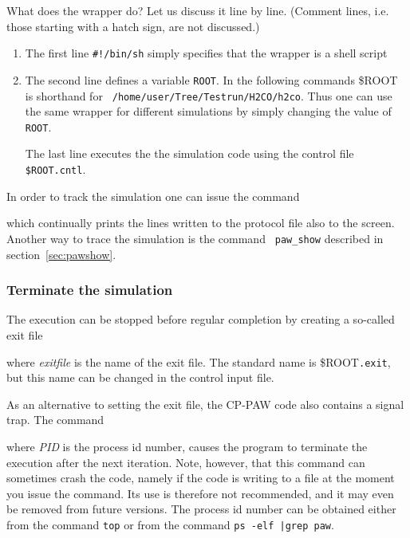\documentclass[final,12pt,makeidx,DIV=calc]{article}
\begin{document}
What does the wrapper do? Let us discuss it line by line. (Comment
lines, i.e. those starting with a hatch sign, are not discussed.)
\begin{enumerate}
\item The first line {\tt \#!/bin/sh} simply specifies that the
  wrapper is a shell script
\item The second line defines a variable {\tt ROOT}. In the following
  commands \${ROOT} is shorthand for {\tt
  /home/user/Tree/Testrun/H2CO/h2co}. Thus one can use the same
  wrapper for different simulations by simply changing the value of
  {\tt ROOT}.
\begin{sloppypar}
  The last line executes the the simulation code using the control
  file {\tt \${ROOT}.cntl}. 
\end{sloppypar}
\end{enumerate}

In order to track the simulation one can issue the command

\bigskip{}\bigskip

which continually prints the lines written to the protocol file also
to the screen. Another way to trace the simulation is the command {\tt
paw\_show} described in section~\ref{sec:pawshow}.


\subsubsection{Terminate the simulation}

The execution can be stopped before regular completion by creating a
so-called exit file

\bigskip{}\bigskip

\noindent where {\it exitfile} is the name of the exit file. 
The standard name is \$ROOT{\tt .exit}, but this name can be changed
in the control input file.

As an alternative to setting the exit file, the CP-PAW code also contains
a signal trap. The command

\bigskip{}\bigskip

\noindent where {\it PID} is the process id number, causes the program
to terminate the execution after the next iteration. Note, however,
that this command can sometimes crash the code, namely if the code is
writing to a file at the moment you issue the command.  Its use is
therefore not recommended, and it may even be removed from future
versions. The process id number can be obtained either from the
command \verb|top| or from the command \verb+ps -elf |grep paw+.
\end{document}
